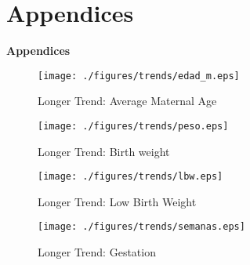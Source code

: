 \documentclass[10pt,letterpaper,subeqn]{beamer}
\begin{document}
\section{Appendices}
\begin{frame}
\begin{center}
  \textbf{Appendices}
\end{center}
\end{frame}


\setcounter{table}{0}
\renewcommand{\thetable}{A\arabic{table}}
\setcounter{figure}{0}
\renewcommand{\thefigure}{A\arabic{figure}}

\begin{frame}[label=longTrends]
\begin{figure}[htpb!]
  \begin{center}
  \centering
  \caption{Longer Trend: Average Maternal Age}
  \texttt{[image: ./figures/trends/edad\_m.eps]}
\end{center}
\end{figure}
\footnotesize{\hyperlink{Trends}{}}
\end{frame}

\begin{frame}
\begin{figure}[htpb!]
  \begin{center}
  \centering
  \caption{Longer Trend: Birth weight}
  \texttt{[image: ./figures/trends/peso.eps]}
\end{center}
\end{figure}
\footnotesize{\hyperlink{Trends}{}}
\end{frame}

\begin{frame}
\begin{figure}[htpb!]
  \begin{center}
  \centering
  \caption{Longer Trend: Low Birth Weight}
  \texttt{[image: ./figures/trends/lbw.eps]}
\end{center}
\end{figure}
\footnotesize{\hyperlink{Trends}{}}
\end{frame}

\begin{frame}
\begin{figure}[htpb!]
  \begin{center}
  \centering
  \caption{Longer Trend: Gestation}
  \texttt{[image: ./figures/trends/semanas.eps]}
\end{center}
\end{figure}
\footnotesize{\hyperlink{Trends}{}}
\end{frame}
\end{document}
